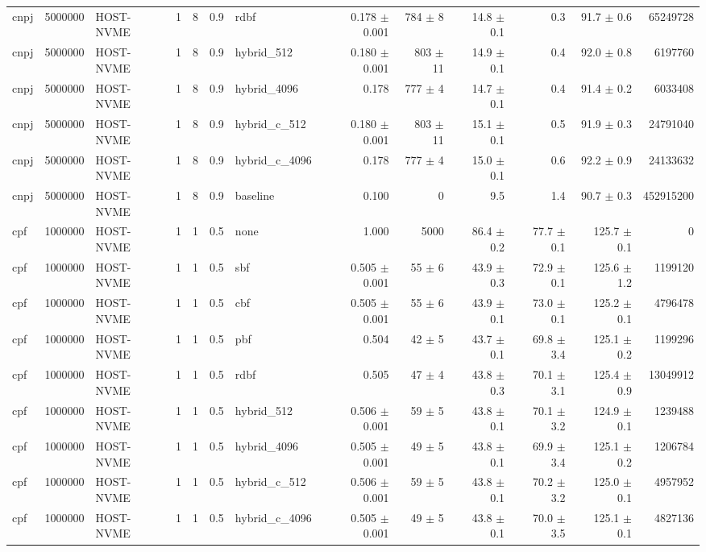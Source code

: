 \begin{tabular}{lllllllrrrrrr}
cnpj & 5000000 & HOST-NVME & 1 & 8 & 0.9 & rdbf & 0.178 $\pm$ 0.001 & 784 $\pm$ 8 & 14.8 $\pm$ 0.1 & 0.3 & 91.7 $\pm$ 0.6 & 65249728 \\
cnpj & 5000000 & HOST-NVME & 1 & 8 & 0.9 & hybrid\_512 & 0.180 $\pm$ 0.001 & 803 $\pm$ 11 & 14.9 $\pm$ 0.1 & 0.4 & 92.0 $\pm$ 0.8 & 6197760 \\
cnpj & 5000000 & HOST-NVME & 1 & 8 & 0.9 & hybrid\_4096 & 0.178 & 777 $\pm$ 4 & 14.7 $\pm$ 0.1 & 0.4 & 91.4 $\pm$ 0.2 & 6033408 \\
cnpj & 5000000 & HOST-NVME & 1 & 8 & 0.9 & hybrid\_c\_512 & 0.180 $\pm$ 0.001 & 803 $\pm$ 11 & 15.1 $\pm$ 0.1 & 0.5 & 91.9 $\pm$ 0.3 & 24791040 \\
cnpj & 5000000 & HOST-NVME & 1 & 8 & 0.9 & hybrid\_c\_4096 & 0.178 & 777 $\pm$ 4 & 15.0 $\pm$ 0.1 & 0.6 & 92.2 $\pm$ 0.9 & 24133632 \\
cnpj & 5000000 & HOST-NVME & 1 & 8 & 0.9 & baseline & 0.100 & 0 & 9.5 & 1.4 & 90.7 $\pm$ 0.3 & 452915200 \\
cpf & 1000000 & HOST-NVME & 1 & 1 & 0.5 & none & 1.000 & 5000 & 86.4 $\pm$ 0.2 & 77.7 $\pm$ 0.1 & 125.7 $\pm$ 0.1 & 0 \\
cpf & 1000000 & HOST-NVME & 1 & 1 & 0.5 & sbf & 0.505 $\pm$ 0.001 & 55 $\pm$ 6 & 43.9 $\pm$ 0.3 & 72.9 $\pm$ 0.1 & 125.6 $\pm$ 1.2 & 1199120 \\
cpf & 1000000 & HOST-NVME & 1 & 1 & 0.5 & cbf & 0.505 $\pm$ 0.001 & 55 $\pm$ 6 & 43.9 $\pm$ 0.1 & 73.0 $\pm$ 0.1 & 125.2 $\pm$ 0.1 & 4796478 \\
cpf & 1000000 & HOST-NVME & 1 & 1 & 0.5 & pbf & 0.504 & 42 $\pm$ 5 & 43.7 $\pm$ 0.1 & 69.8 $\pm$ 3.4 & 125.1 $\pm$ 0.2 & 1199296 \\
cpf & 1000000 & HOST-NVME & 1 & 1 & 0.5 & rdbf & 0.505 & 47 $\pm$ 4 & 43.8 $\pm$ 0.3 & 70.1 $\pm$ 3.1 & 125.4 $\pm$ 0.9 & 13049912 \\
cpf & 1000000 & HOST-NVME & 1 & 1 & 0.5 & hybrid\_512 & 0.506 $\pm$ 0.001 & 59 $\pm$ 5 & 43.8 $\pm$ 0.1 & 70.1 $\pm$ 3.2 & 124.9 $\pm$ 0.1 & 1239488 \\
cpf & 1000000 & HOST-NVME & 1 & 1 & 0.5 & hybrid\_4096 & 0.505 $\pm$ 0.001 & 49 $\pm$ 5 & 43.8 $\pm$ 0.1 & 69.9 $\pm$ 3.4 & 125.1 $\pm$ 0.2 & 1206784 \\
cpf & 1000000 & HOST-NVME & 1 & 1 & 0.5 & hybrid\_c\_512 & 0.506 $\pm$ 0.001 & 59 $\pm$ 5 & 43.8 $\pm$ 0.1 & 70.2 $\pm$ 3.2 & 125.0 $\pm$ 0.1 & 4957952 \\
cpf & 1000000 & HOST-NVME & 1 & 1 & 0.5 & hybrid\_c\_4096 & 0.505 $\pm$ 0.001 & 49 $\pm$ 5 & 43.8 $\pm$ 0.1 & 70.0 $\pm$ 3.5 & 125.1 $\pm$ 0.1 & 4827136 \\

\end{tabular}
